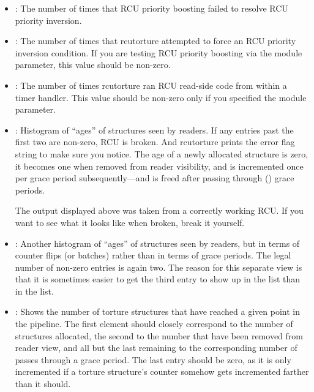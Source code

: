 \begin{itemize}
\item	{}: The number of times that RCU priority boosting failed
	to resolve RCU priority inversion.

\item	{}: The number of times that rcutorture attempted to force
	an RCU priority inversion condition.
	If you are testing RCU
	priority boosting via the  module parameter, this
	value should be non-zero.

\item	{}: The number of times rcutorture ran RCU read-side code from
	within a timer handler.
	This value should be non-zero only
	if you specified the  module parameter.

\item	{}: Histogram of ``ages'' of structures seen by readers.
	If any entries past the first two are non-zero, RCU is broken.
	And rcutorture prints the error flag string \qco{!!!} to make sure
	you notice.
	The age of a newly allocated structure is zero,
	it becomes one when removed from reader visibility, and is
	incremented once per grace period subsequently---and is freed
	after passing through () grace periods.

	The output displayed above was taken from a correctly working
	RCU\@.
	If you want to see what it looks like when broken, break
	it yourself.
	\Winkey %

\item	{}: Another histogram of ``ages'' of structures seen
	by readers, but in terms of counter flips (or batches) rather
	than in terms of grace periods.
	The legal number of non-zero
	entries is again two.
	The reason for this separate view is that
	it is sometimes easier to get the third entry to show up in the
	 list than in the  list.

\item	{}: Shows the number of torture structures
	that have reached a given point in the pipeline.
	The first element
	should closely correspond to the number of structures allocated,
	the second to the number that have been removed from reader view,
	and all but the last remaining to the corresponding number of
	passes through a grace period.
	The last entry should be zero,
	as it is only incremented if a torture structure's counter
	somehow gets incremented farther than it should.
\end{itemize}

